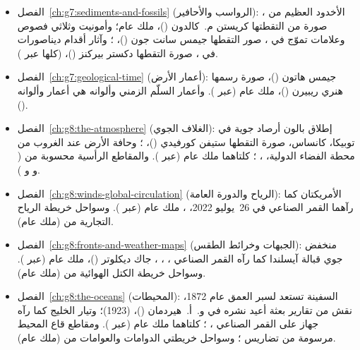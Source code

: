 \begin{itemize}
  \item الفصل~\ref{ch:g7:sediments-and-fossils} (الرواسب والأحافير): الأخدود العظيم من ، صورة من  التقطتها كريستن م.~كالدون ()، ملك عام؛ وأمونيت وثلاثي فصوص وعلامات تموّج في ، صور التقطها جيمس سانت جون ()، ؛ وآثار أقدام ديناصورات في ، صورة التقطها دكستر بيركنز ()،  (كلها عبر ).
  \item الفصل~\ref{ch:g7:geological-time} (أعمار الأرض): جيمس هاتون ()، صورة رسمها هنري ريبيرن ()، ملك عام (عبر ). وأعمار السلّم الزمني وألوانه هي أعمار  وألوانه ().
  \item الفصل~\ref{ch:g8:the-atmosphere} (الغلاف الجوي): إطلاق بالون أرصاد جوية في توبيكا، كانساس، صورة التقطها ستيفن كورفيدي ()، ؛ وحافة الأرض عند الغروب من محطة الفضاء الدولية، ، ؛ كلتاهما ملك عام (عبر ). والمقاطع الرأسية محسوبة من  ( و  و ).
  \item الفصل~\ref{ch:g8:winds-global-circulation} (الرياح والدورة العامة): الأمريكتان كما رآهما القمر الصناعي  في 26~يوليو 2022، ، ملك عام (عبر ). وسواحل خريطة الرياح التجارية من  (ملك عام).
  \item الفصل~\ref{ch:g8:fronts-and-weather-maps} (الجبهات وخرائط الطقس): منخفض جوي قبالة آيسلندا كما رآه القمر الصناعي ، ، ، جاك ديكلوتر ()، ملك عام (عبر ). وسواحل خريطة الكتل الهوائية من  (ملك عام).
  \item الفصل~\ref{ch:g8:the-oceans} (المحيطات): السفينة  تستعد لسبر العمق عام 1872، نقش من تقارير بعثة  أعيد نشره في و.~أ.~هيردمان ()،  (1923)؛ وتيار الخليج كما رآه جهاز  على القمر الصناعي ، ؛ كلتاهما ملك عام (عبر ). ومقاطع قاع المحيط مرسومة من تضاريس ؛ وسواحل خريطتي الدوامات والعوامات من  (ملك عام).

\end{itemize}
